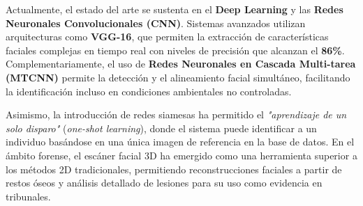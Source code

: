 Actualmente, el estado del arte se sustenta en el \textbf{Deep Learning} y las \textbf{Redes Neuronales Convolucionales (CNN)}. Sistemas avanzados utilizan arquitecturas como \textbf{VGG-16}, que permiten la extracción de características faciales complejas en tiempo real con niveles de precisión que alcanzan el \textbf{86\%}. Complementariamente, el uso de \textbf{Redes Neuronales en Cascada Multi-tarea (MTCNN)} permite la detección y el alineamiento facial simultáneo, facilitando la identificación incluso en condiciones ambientales no controladas.

Asimismo, la introducción de redes siamesas ha permitido el \textit{"aprendizaje de un solo disparo"} (\textit{one-shot learning}), donde el sistema puede identificar a un individuo basándose en una única imagen de referencia en la base de datos. En el ámbito forense, el escáner facial 3D ha emergido como una herramienta superior a los métodos 2D tradicionales, permitiendo reconstrucciones faciales a partir de restos óseos y análisis detallado de lesiones para su uso como evidencia en tribunales.